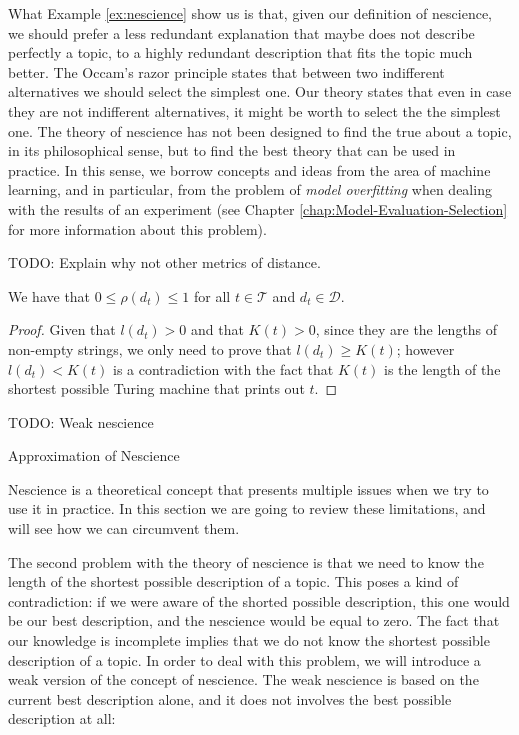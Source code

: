 What Example \ref{ex:nescience} show us is that, given our definition of nescience, we should prefer a less redundant explanation that maybe does not describe perfectly a topic, to a highly redundant description that fits the topic much better. The Occam's razor principle states that between two indifferent alternatives we should select the simplest one. Our theory states that even in case they are not indifferent alternatives, it might be worth to select the the simplest one. The theory of nescience has not been designed to find the true about a topic, in its philosophical sense, but to find the best theory that can be used in practice. In this sense, we borrow concepts and ideas from the area of machine learning, and in particular, from the problem of \emph{model overfitting} when dealing with the results of an experiment (see Chapter \ref{chap:Model-Evaluation-Selection} for more information about this problem).

{\color{red} TODO: Explain why not other metrics of distance.}

\begin{proposition}
\label{prop:range_redundancy}
We have that $0 \leq \rho(d_t) \leq 1$ for all $t \in \mathcal{T}$ and $d_t \in \mathcal{D}$.
\end{proposition}
\begin{proof}
Given that $l\left(d_t\right)>0$ and that $K\left(t\right)>0$, since they are the lengths of non-empty strings, we only need to prove that $l\left(d_t\right) \geq K\left(t\right)$; however $l\left(d_t\right) < K\left(t\right)$ is a contradiction with the fact that $K\left(t\right)$ is the length of the shortest possible Turing machine that prints out $t$.
\end{proof}


{\color{red} TODO: Weak nescience}


{\color{red} Approximation of Nescience}

Nescience is a theoretical concept that presents multiple issues when we try to use it in practice. In this section we are going to review these limitations, and will see how we can circumvent them.

The second problem with the theory of nescience is that we need to know the length of the shortest possible description of a topic. This poses a kind of contradiction: if we were aware of the shorted possible description, this one would be our best description, and the nescience would be equal to zero. The fact that our knowledge is incomplete implies that we do not know the shortest possible description of a topic. In order to deal with this problem, we will introduce a weak version of the concept of nescience. The weak nescience is based on the current best description alone, and it does not involves the best possible description at all:

